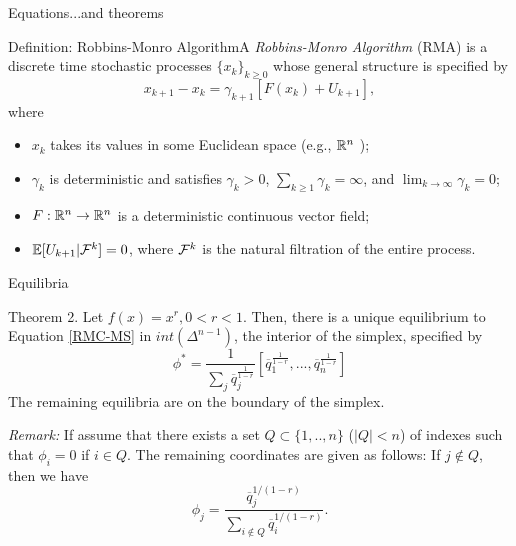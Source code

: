 \begin{frame}[c]{Equations}{...and theorems}
\begin{block}{Definition: Robbins-Monro Algorithm}A {\it Robbins-Monro
    Algorithm} (RMA) is a discrete time stochastic processes
  $\{x_k\}_{k \geq 0}$ whose general structure is specified by
\begin{equation}
\label{RMA}
x_{k+1}-x_k=\gamma_{k+1}[F(x_k)+U_{k+1}],
\end{equation}
\noindent	
where
\begin{itemize}
\item $x_k$ takes its values in some Euclidean space (e.g., $\mathbb{R}^n$ );
\item $\gamma_k$ is deterministic and satisfies $\gamma_k>0$,
  $\sum_{k \geq 1}\gamma_k=\infty$, and $\lim_{k \to\infty}\gamma_k=0$;
\item $F:\mathbb{R}^n\to\mathbb{R}^n$ is a deterministic continuous vector field;
\item $\mathbb{E}[U_{k+1}| \mathcal{F}^k]=0$, where $\mathcal{F}^k$ is the natural filtration of
  the entire process.%
\end{itemize}
\end{block}
	
\end{frame}	
	
	
	







\begin{frame}[c]{Equilibria}
\begin{exampleblock}{Theorem 2.} 
\label{eqs}
Let $f(x)=x^r, 0<r<1$. Then, there is a unique equilibrium to Equation \eqref{RMC-MS} 
in $int(\Delta^{n-1})$, the interior of the simplex, specified by 
\[
\phi^*=\dfrac{1}{\sum_j
  \overline{q}_j^{\frac{1}{1-r}}}[\overline{q}_1^{\frac{1}{1-r}},...,\overline{q}_n^{\frac{1}{1-r}}]
\]
The remaining equilibria are on the boundary of the simplex.
\end{exampleblock}


\textcolor{anugold}{\textit{Remark:}}
If assume that there exists a set $Q\subset \{1,..,n\}$
($|Q|<n$) of indexes such that $\phi_i=0$ if $i\in Q$. The remaining coordinates are given as follows: If $j \notin
Q$, then we have
\[
\phi_j=\frac{\overline{q}_j^{1/(1-r)}}{\sum_{i\notin Q}\overline{q}_i^{1/(1-r)}}.
\]

%
\end{frame}


